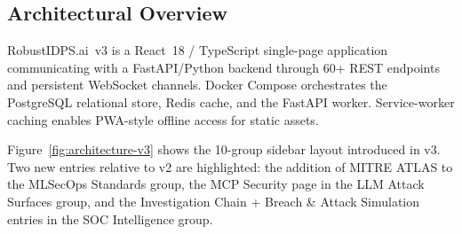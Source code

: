 \documentclass[11pt,a4paper]{article}
\begin{document}
\subsection{Architectural Overview}
RobustIDPS.ai~v3 is a React~18 / TypeScript single-page application
communicating with a FastAPI/Python backend through 60+ REST endpoints
and persistent WebSocket channels.  Docker Compose orchestrates the
PostgreSQL relational store, Redis cache, and the FastAPI worker.
Service-worker caching enables PWA-style offline access for static
assets.

Figure~\ref{fig:architecture-v3} shows the 10-group sidebar layout
introduced in v3.  Two new entries relative to v2 are highlighted:
the addition of MITRE ATLAS to the MLSecOps Standards group, the
MCP Security page in the LLM Attack Surfaces group, and the
Investigation Chain + Breach \& Attack Simulation entries in the
SOC Intelligence group.
\end{document}
